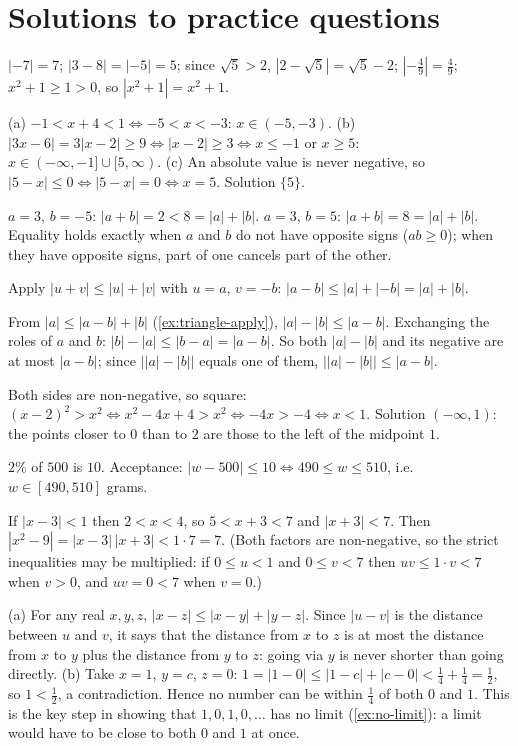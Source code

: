 \section{Solutions to practice questions}
$|-7|=7$; $|3-8|=|-5|=5$; since $\sqrt5>2$, $|2-\sqrt5|=\sqrt5-2$; $|-\tfrac49|=\tfrac49$; $x^2+1\ge1>0$, so
$|x^2+1|=x^2+1$.

(a) $-1<x+4<1\Leftrightarrow-5<x<-3$: $x\in(-5,-3)$.
(b) $|3x-6|=3|x-2|\ge9\Leftrightarrow|x-2|\ge3\Leftrightarrow x\le-1$ or $x\ge5$: $x\in(-\infty,-1]\cup[5,\infty)$.
(c) An absolute value is never negative, so $|5-x|\le0\Leftrightarrow|5-x|=0\Leftrightarrow x=5$. Solution $\{5\}$.

$a=3$, $b=-5$: $|a+b|=2<8=|a|+|b|$. $a=3$, $b=5$: $|a+b|=8=|a|+|b|$. Equality holds exactly when $a$ and $b$ do not have
opposite signs ($ab\ge0$); when they have opposite signs, part of one cancels part of the other.

Apply $|u+v|\le|u|+|v|$ with $u=a$, $v=-b$: $|a-b|\le|a|+|-b|=|a|+|b|$.

From $|a|\le|a-b|+|b|$ (\cref{ex:triangle-apply}), $|a|-|b|\le|a-b|$. Exchanging the roles of $a$ and $b$:
$|b|-|a|\le|b-a|=|a-b|$. So both $|a|-|b|$ and its negative are at most $|a-b|$; since $\big||a|-|b|\big|$ equals one of
them, $\big||a|-|b|\big|\le|a-b|$.

Both sides are non-negative, so square: $(x-2)^2>x^2\Leftrightarrow x^2-4x+4>x^2\Leftrightarrow-4x>-4\Leftrightarrow x<1$.
Solution $(-\infty,1)$: the points closer to $0$ than to $2$ are those to the left of the midpoint $1$.

$2\%$ of $500$ is $10$. Acceptance: $|w-500|\le10\Leftrightarrow490\le w\le510$, i.e.\ $w\in[490,510]$ grams.

If $|x-3|<1$ then $2<x<4$, so $5<x+3<7$ and $|x+3|<7$. Then $|x^2-9|=|x-3|\,|x+3|<1\cdot7=7$. (Both factors are
non-negative, so the strict inequalities may be multiplied: if $0\le u<1$ and $0\le v<7$ then $uv\le 1\cdot v<7$ when
$v>0$, and $uv=0<7$ when $v=0$.)

(a) For any real $x,y,z$, $|x-z|\le|x-y|+|y-z|$. Since $|u-v|$ is the distance between $u$ and $v$, it says that the
distance from $x$ to $z$ is at most the distance from $x$ to $y$ plus the distance from $y$ to $z$: going via $y$ is
never shorter than going directly.
(b) Take $x=1$, $y=c$, $z=0$:
$1=|1-0|\le|1-c|+|c-0|<\tfrac14+\tfrac14=\tfrac12$, so $1<\tfrac12$, a contradiction. Hence no number can be within
$\tfrac14$ of both $0$ and $1$. This is the key step in showing that $1,0,1,0,\dots$ has no limit (\cref{ex:no-limit}): a
limit would have to be close to both $0$ and $1$ at once.
